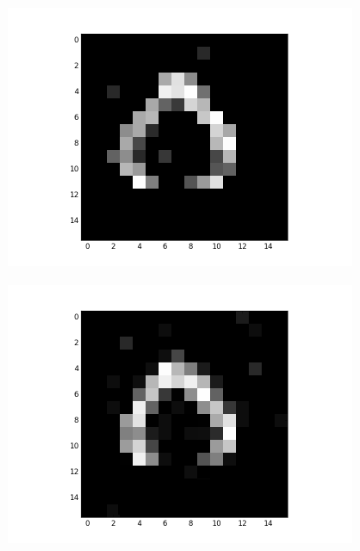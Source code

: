 \begin{figure}[h!]
	\centering
	\begin{subfigure}{.25\textwidth}
  		\centering
  		\includegraphics[width=\linewidth]{imgs/poker/compl11.png}
  		\label{fig:sub1}
	\end{subfigure}%
	\begin{subfigure}{.25\textwidth}
  		\centering
  		\includegraphics[width=\linewidth]{imgs/poker/compl21.png}
  		\label{fig:sub1}
	\end{subfigure}%
	\begin{subfigure}{.25\textwidth}
  		\centering

\end{subfigure}
\end{figure}
